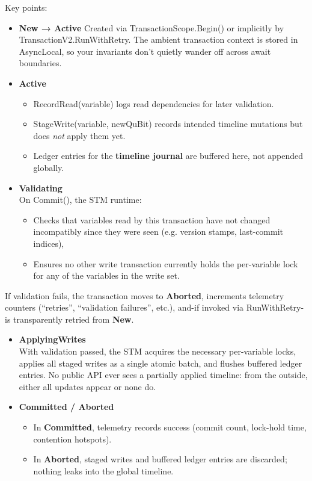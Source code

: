 \documentclass[a4paper,11pt]{article}
\begin{document}
Key points:

\begin{itemize}
\item
  \textbf{New → Active}
  Created via TransactionScope.Begin() or implicitly by TransactionV2.RunWithRetry. The ambient transaction context is stored in AsyncLocal, so your invariants don't quietly wander off across await boundaries.
\item
  \textbf{Active}

  \begin{itemize}
  \item
    RecordRead(variable) logs read dependencies for later validation.
  \item
    StageWrite(variable, newQuBit) records intended timeline mutations but does \emph{not} apply them yet.
  \item
    Ledger entries for the \textbf{timeline journal} are buffered here, not appended globally.
  \end{itemize}
\item
  \textbf{Validating}\\
  On Commit(), the STM runtime:

  \begin{itemize}
  \item
    Checks that variables read by this transaction have not changed incompatibly since they were seen (e.g. version stamps, last-commit indices),
  \item
    Ensures no other write transaction currently holds the per-variable lock for any of the variables in the write set.
  \end{itemize}
\end{itemize}

If validation fails, the transaction moves to \textbf{Aborted}, increments telemetry counters (``retries'', ``validation failures'', etc.), and-if invoked via RunWithRetry-is transparently retried from \textbf{New}.

\begin{itemize}
\item
  \textbf{ApplyingWrites}\\
  With validation passed, the STM acquires the necessary per-variable locks, applies all staged writes as a single atomic batch, and flushes buffered ledger entries. No public API ever sees a partially applied timeline: from the outside, either all updates appear or none do.
\item
  \textbf{Committed / Aborted}

  \begin{itemize}
  \item
    In \textbf{Committed}, telemetry records success (commit count, lock-hold time, contention hotspots).
  \item
    In \textbf{Aborted}, staged writes and buffered ledger entries are discarded; nothing leaks into the global timeline.
  \end{itemize}
\end{itemize}
\end{document}
